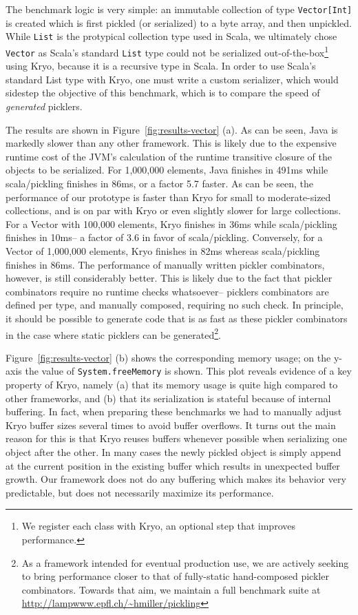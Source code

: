 \documentclass[preprint,10pt]{sigplanconf}
\theoremstyle{definition}
\theoremstyle{definition}
\begin{document}
The benchmark logic is very simple: an immutable collection of type
\verb|Vector[Int]| is created which is first pickled (or serialized)
to a byte array, and then unpickled. While \verb|List| is the protypical collection type used in Scala, we ultimately chose \verb|Vector| as
Scala's standard \verb|List| type could not be serialized out-of-the-box\footnote{We register each class with Kryo, an optional step that improves performance.}
using Kryo, because it is a recursive type in Scala. In order to use Scala's standard List type with Kryo, one must write a custom serializer, which would sidestep the objective of this benchmark, which is to compare the speed of {\em generated} picklers.

The results are
shown in Figure~\ref{fig:results-vector} (a). As can be seen, Java is markedly slower than any other framework. This is likely due to the expensive runtime cost of the JVM's calculation of the runtime transitive closure of the objects to be serialized. For 1,000,000 elements, Java finishes in 491ms while scala/pickling finishes in 86ms, or a factor 5.7 faster. As can be seen, the
performance of our prototype is faster than Kryo for small to moderate-sized collections, and is on par with Kryo or even slightly slower for large collections. For a Vector with 100,000 elements, Kryo finishes in 36ms while scala/pickling finishes in 10ms-- a factor of 3.6 in favor of scala/pickling. Conversely, for a Vector of 1,000,000 elements, Kryo finishes in 82ms whereas scala/pickling finishes in 86ms. The
performance of manually written pickler combinators, however, is still
considerably better. This is likely due to the fact that pickler combinators require no runtime checks whatsoever-- picklers combinators are defined per type, and manually composed, requiring no such check. In principle, it should be possible to generate code
that is as fast as these pickler combinators in the case
where static picklers can be generated\footnote{As a framework intended for eventual production use, we are actively seeking to bring performance closer to that of fully-static hand-composed pickler combinators. Towards that aim, we maintain a full benchmark suite at \url{http://lampwww.epfl.ch/~hmiller/pickling}}.

Figure~\ref{fig:results-vector} (b) shows the corresponding memory usage; on the
y-axis the value of \texttt{System.freeMemory} is shown. This plot
reveals evidence of a key property of Kryo, namely (a) that its memory usage
is quite high compared to other frameworks, and (b) that its
serialization is stateful because of internal buffering. In fact, when
preparing these benchmarks we had to manually adjust Kryo buffer sizes
several times to avoid buffer overflows. It turns out the main reason
for this is that Kryo reuses buffers whenever possible when
serializing one object after the other. In many cases the
newly pickled object is simply append at the current position in the
existing buffer which results in unexpected buffer growth. Our
framework does not do any buffering which makes its behavior very
predictable, but does not necessarily maximize its performance.
\end{document}
